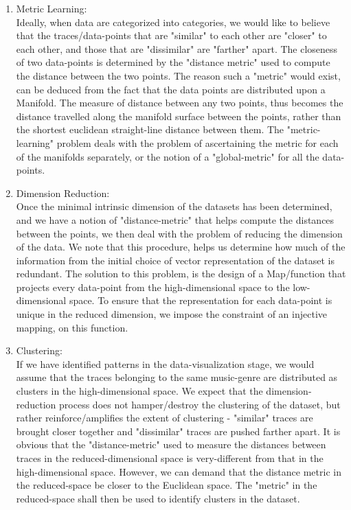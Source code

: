 \documentclass[10pt]{article}
\begin{document}
\begin{enumerate}
\item Metric Learning:\\
Ideally, when data are categorized into categories, we would like to believe that the traces/data-points that are "similar" to each other are "closer" to each other, and those that are "dissimilar" are "farther" apart. The closeness of two data-points is determined by the "distance metric" used to compute the distance between the two points. The reason such a "metric" would exist, can be deduced from the fact that the data points are distributed upon a Manifold. The measure of distance between any two points, thus becomes the distance travelled along the manifold surface between the points, rather than the shortest euclidean straight-line distance between them. The "metric-learning" problem deals with the problem of ascertaining the metric for each of the manifolds separately, or the notion of a "global-metric" for all the data-points.

\item Dimension Reduction:\\
Once the minimal intrinsic dimension of the datasets has been determined, and we have a notion of "distance-metric" that helps compute the distances between the points, we then deal with the problem of reducing the dimension of the data. We note that this procedure, helps us determine how much of the information from the initial choice of vector representation of the dataset is redundant. The solution to this problem, is the design of a Map/function that projects every data-point from the high-dimensional space to the low-dimensional space. To ensure that the representation for each data-point is unique in the reduced dimension, we impose the constraint of an injective mapping, on this function. 


\item Clustering:\\
If we have identified patterns in the data-visualization stage, we would assume that the traces belonging to the same music-genre are distributed as clusters in the high-dimensional space. We expect that the dimension-reduction process does not hamper/destroy the clustering of the dataset, but rather reinforce/amplifies the extent of clustering - "similar" traces are brought closer together and "dissimilar" traces are pushed farther apart. It is obvious that the "distance-metric" used to measure the distances between traces in the reduced-dimensional space is very-different from that in the high-dimensional space. However, we can demand that the distance metric in the reduced-space be closer to the Euclidean space. The "metric" in the reduced-space shall then be used to identify clusters in the dataset. 


\end{enumerate}
\end{document}
